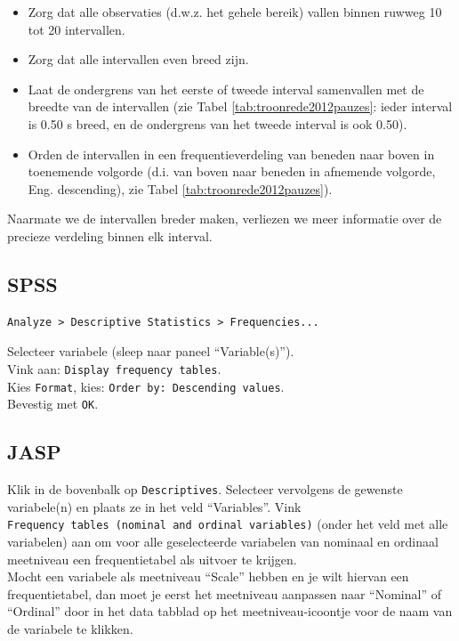 \documentclass[
]{book}
\begin{document}
\begin{itemize}
\item
  Zorg dat alle observaties (d.w.z. het gehele bereik) vallen binnen
  ruwweg 10 tot 20 intervallen.
\item
  Zorg dat alle intervallen even breed zijn.
\item
  Laat de ondergrens van het eerste of tweede interval samenvallen met
  de breedte van de intervallen (zie
  Tabel \ref{tab:troonrede2012pauzes}: ieder interval is 0.50 s
  breed, en de ondergrens van het tweede interval is ook 0.50).
\item
  Orden de intervallen in een frequentieverdeling van beneden naar
  boven in toenemende volgorde (d.i. van boven naar beneden in
  afnemende volgorde, Eng. descending), zie
  Tabel \ref{tab:troonrede2012pauzes}).
\end{itemize}

Naarmate we de intervallen breder maken, verliezen we meer informatie
over de precieze verdeling binnen elk interval.

\hypertarget{spss-1}{%
\subsection{SPSS}\label{spss-1}}

\begin{verbatim}
Analyze > Descriptive Statistics > Frequencies...
\end{verbatim}

Selecteer variabele (sleep naar paneel ``Variable(s)'').\\
Vink aan: \texttt{Display\ frequency\ tables}.\\
Kies \texttt{Format}, kies: \texttt{Order\ by:\ Descending\ values}.\\
Bevestig met \texttt{OK}.\\

\hypertarget{jasp-1}{%
\subsection{JASP}\label{jasp-1}}

Klik in de bovenbalk op \texttt{Descriptives}. Selecteer vervolgens de gewenste variabele(n) en plaats ze in het veld ``Variables''. Vink \texttt{Frequency\ tables\ (nominal\ and\ ordinal\ variables)} (onder het veld met alle variabelen) aan om voor alle geselecteerde variabelen van nominaal en ordinaal meetniveau een frequentietabel als uitvoer te krijgen.\\
Mocht een variabele als meetniveau ``Scale'' hebben en je wilt hiervan een frequentietabel, dan moet je eerst het meetniveau aanpassen naar ``Nominal'' of ``Ordinal'' door in het data tabblad op het meetniveau-icoontje voor de naam van de variabele te klikken.
\end{document}
